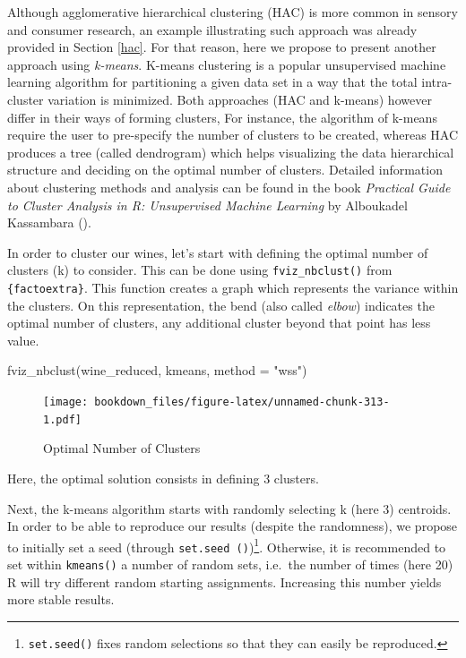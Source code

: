 \documentclass[
]{krantz}
\makeatletter
\newenvironment{Shaded}{\begin{snugshade}}{\end{snugshade}}
\newcommand{\AttributeTok}[1]{\textcolor[rgb]{0.61,0.61,0.61}{#1}}
\newcommand{\FunctionTok}[1]{\textcolor[rgb]{0,0,0}{#1}}
\newcommand{\NormalTok}[1]{#1}
\newcommand{\StringTok}[1]{\textcolor[rgb]{0.5,0.5,0.5}{#1}}
\newenvironment{kframe}{%
\medskip{}
\setlength{\fboxsep}{.8em}
 \def\at@end@of@kframe{}%
 \ifinner\ifhmode%
  \def\at@end@of@kframe{\end{minipage}}%
  \begin{minipage}{\columnwidth}%
 \fi\fi%
 \def\FrameCommand##1{\hskip\@totalleftmargin \hskip-\fboxsep
 \colorbox{shadecolor}{##1}\hskip-\fboxsep
     \hskip-\linewidth \hskip-\@totalleftmargin \hskip\columnwidth}%
 \MakeFramed {\advance\hsize-\width
   \@totalleftmargin\z@ \linewidth\hsize
   \@setminipage}}%
 {\par\unskip\endMakeFramed%
 \at@end@of@kframe}
\renewenvironment{Shaded}{\begin{kframe}}{\end{kframe}}
\makeatother
\begin{document}
Although agglomerative hierarchical clustering (HAC) is more common in sensory and consumer research, an example illustrating such approach was already provided in Section \ref{hac}. For that reason, here we propose to present another approach using \emph{k-means}.
K-means clustering is a popular unsupervised machine learning algorithm for partitioning a given data set in a way that the total intra-cluster variation is minimized. Both approaches (HAC and k-means) however differ in their ways of forming clusters, For instance, the algorithm of k-means require the user to pre-specify the number of clusters to be created, whereas HAC produces a tree (called dendrogram) which helps visualizing the data hierarchical structure and deciding on the optimal number of clusters. Detailed information about clustering methods and analysis can be found in the book \emph{Practical Guide to Cluster Analysis in R: Unsupervised Machine Learning} by Alboukadel Kassambara (\citet{Kassambara2017}).

In order to cluster our wines, let's start with defining the optimal number of clusters (k) to consider. This can be done using \texttt{fviz\_nbclust()} from \texttt{\{factoextra\}}. This function creates a graph which represents the variance within the clusters. On this representation, the bend (also called \emph{elbow}) indicates the optimal number of clusters, any additional cluster beyond that point has less value.

\begin{Shaded}
\begin{Highlighting}[]
\FunctionTok{fviz\_nbclust}\NormalTok{(wine\_reduced, kmeans, }\AttributeTok{method =} \StringTok{"wss"}\NormalTok{)}
\end{Highlighting}
\end{Shaded}

\begin{figure}
\centering
\texttt{[image: bookdown\_files/figure-latex/unnamed-chunk-313-1.pdf]}
\caption{\label{fig:unnamed-chunk-313}Optimal Number of Clusters}
\end{figure}

Here, the optimal solution consists in defining 3 clusters.

Next, the k-means algorithm starts with randomly selecting k (here 3) centroids. In order to be able to reproduce our results (despite the randomness), we propose to initially set a seed (through \texttt{set.seed\ ()})\footnote{\texttt{set.seed()} fixes random selections so that they can easily be reproduced.}. Otherwise, it is recommended to set within \texttt{kmeans()} a number of random sets, i.e.~the number of times (here 20) R will try different random starting assignments. Increasing this number yields more stable results.
\end{document}
